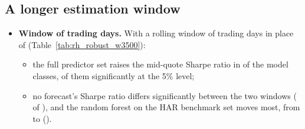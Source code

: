 \subsection{A longer estimation window}
\label{app:rh_econ_robust}
\begin{itemize}
\item \textbf{Window of \rhrbWinLong{} trading days.} With a rolling window of \rhrbWinLong{} trading days in place of
  \rhrbWinMain{} (Table~\ref{tab:rh_robust_w3500}):
  \begin{itemize}
  \item the full predictor set raises the mid-quote Sharpe ratio in \rhrbNDSRFPosMidLong{} of the
    \rhrbNModelsLong{} model classes, \rhrbNDSRFSigMidLong{} of them significantly at the 5\% level;
  \item no forecast's Sharpe ratio differs significantly between the two windows (\rhrbNSRSigMid{} of
    \rhrbNArms), and the random forest on the HAR benchmark set moves most, from \rhrbSRRfHarMidMain{} to
    \rhrbSRRfHarMidLong{} (\rhrbPSRRfHarMid).
  \end{itemize}
\end{itemize}

